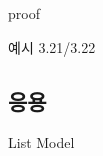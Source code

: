 \documentclass{beamer}
\begin{document}

proof





예시 3.21/3.22





\subsection{응용}

\begin{frame}{List Model}

\end{frame}
\end{document}
